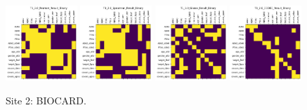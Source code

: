 \begin{figure}
    \includegraphics[width=0.24\textwidth]{chap6/figs/T1_2.0_Pearson_Result_Binary.png}
    \includegraphics[width=0.24\textwidth]{chap6/figs/T1_2.0_Spearman_Result_Binary.png}
    \includegraphics[width=0.24\textwidth]{chap6/figs/T1_2.0_Glasso_Result_Binary.png}
    \includegraphics[width=0.24\textwidth]{chap6/figs/T1_2.0_CODEC_Result_Binary.png}
    \caption{Site 2: BIOCARD.}
    \label{fig:site2}
\end{figure}